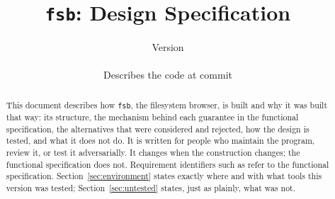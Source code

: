 \documentclass[11pt]{article}
\title{\texttt{fsb}: Design Specification}
\author{}
\date{Version \fsbversion \\ \fsbcodedate \\ \small Describes the code at commit \texttt{\fsbcommit}}
\begin{document}
\maketitle
\begin{abstract}
This document describes how \texttt{fsb}, the filesystem browser, is built and why
it was built that way:
its structure, the mechanism behind each guarantee in the functional specification,
the alternatives that were considered and rejected, how the design is tested, and
what it does not do.  It is written for people who maintain the program, review it, or
test it adversarially.  It changes when the construction changes; the functional
specification does not.  Requirement identifiers such as  refer to the
functional specification.  Section~\ref{sec:environment} states exactly where and
with what tools this version was tested; Section~\ref{sec:untested} states, just as
plainly, what was not.
\end{abstract}

\tableofcontents














\end{document}
